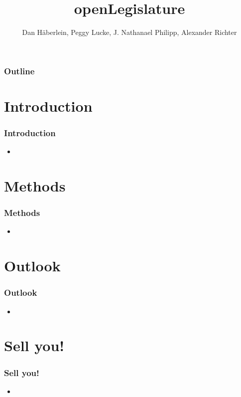 \documentclass[11pt, a4paper]{beamer}
\author{Dan Häberlein, Peggy Lucke, J. Nathanael Philipp, Alexander Richter}
\title{openLegislature}
\date{}
\institute{Universität Leipzig}
\begin{document}
\section{}
\begin{frame}
\titlepage
\end{frame}


	\begin{frame}
		\frametitle{Outline}
		\tableofcontents
	\end{frame}

\section{Introduction}
\begin{frame}
\frametitle{Introduction}
\begin{itemize}
\item 
\end{itemize}
\end{frame}

\section{Methods}
\begin{frame}
\frametitle{Methods}
\begin{itemize}
\item 
\end{itemize}
\end{frame}

\section{Outlook}
\begin{frame}
\frametitle{Outlook}
\begin{itemize}
\item 
\end{itemize}
\end{frame}

\section{Sell you!}
\begin{frame}
\frametitle{Sell you!}
\begin{itemize}
\item 
\end{itemize}
\end{frame}
\end{document}
